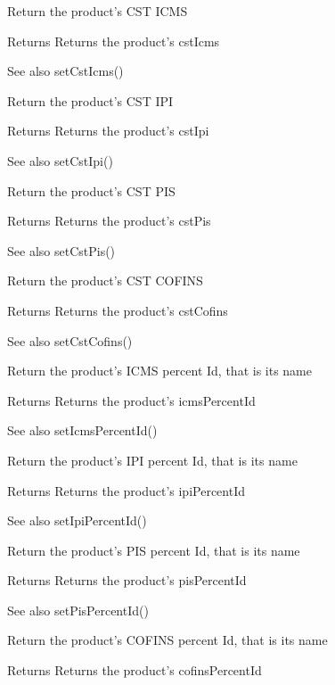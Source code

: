 \-Return the product's \-C\-S\-T \-I\-C\-M\-S \begin{DoxyReturn}{\-Returns}
\-Returns the product's cst\-Icms 
\end{DoxyReturn}
\begin{DoxySeeAlso}{\-See also}
set\-Cst\-Icms()
\end{DoxySeeAlso}
\-Return the product's \-C\-S\-T \-I\-P\-I \begin{DoxyReturn}{\-Returns}
\-Returns the product's cst\-Ipi 
\end{DoxyReturn}
\begin{DoxySeeAlso}{\-See also}
set\-Cst\-Ipi()
\end{DoxySeeAlso}
\-Return the product's \-C\-S\-T \-P\-I\-S \begin{DoxyReturn}{\-Returns}
\-Returns the product's cst\-Pis 
\end{DoxyReturn}
\begin{DoxySeeAlso}{\-See also}
set\-Cst\-Pis()
\end{DoxySeeAlso}
\-Return the product's \-C\-S\-T \-C\-O\-F\-I\-N\-S \begin{DoxyReturn}{\-Returns}
\-Returns the product's cst\-Cofins 
\end{DoxyReturn}
\begin{DoxySeeAlso}{\-See also}
set\-Cst\-Cofins()
\end{DoxySeeAlso}
\-Return the product's \-I\-C\-M\-S percent \-Id, that is its name \begin{DoxyReturn}{\-Returns}
\-Returns the product's icms\-Percent\-Id 
\end{DoxyReturn}
\begin{DoxySeeAlso}{\-See also}
set\-Icms\-Percent\-Id()
\end{DoxySeeAlso}
\-Return the product's \-I\-P\-I percent \-Id, that is its name \begin{DoxyReturn}{\-Returns}
\-Returns the product's ipi\-Percent\-Id 
\end{DoxyReturn}
\begin{DoxySeeAlso}{\-See also}
set\-Ipi\-Percent\-Id()
\end{DoxySeeAlso}
\-Return the product's \-P\-I\-S percent \-Id, that is its name \begin{DoxyReturn}{\-Returns}
\-Returns the product's pis\-Percent\-Id 
\end{DoxyReturn}
\begin{DoxySeeAlso}{\-See also}
set\-Pis\-Percent\-Id()
\end{DoxySeeAlso}
\-Return the product's \-C\-O\-F\-I\-N\-S percent \-Id, that is its name \begin{DoxyReturn}{\-Returns}
\-Returns the product's cofins\-Percent\-Id 
\end{DoxyReturn}
